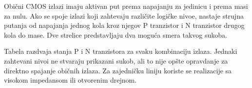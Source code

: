 Obični CMOS izlazi imaju aktivan put prema napajanju za jedinicu i prema masi za nulu. Ako se spoje izlazi koji zahtevaju različite logičke nivoe, nastaje strujna putanja od napajanja jednog kola kroz njegov P tranzistor i N tranzistor drugog kola do mase. Dve strelice predstavljaju dva moguća smera takvog sukoba.

Tabela razdvaja stanja P i N tranzistora za svaku kombinaciju izlaza. Jednaki zahtevani nivoi ne stvaraju prikazani sukob, ali to nije opšte opravdanje za direktno spajanje običnih izlaza. Za zajedničku liniju koriste se realizacije sa visokom impedansom ili otvorenim drejnom.
